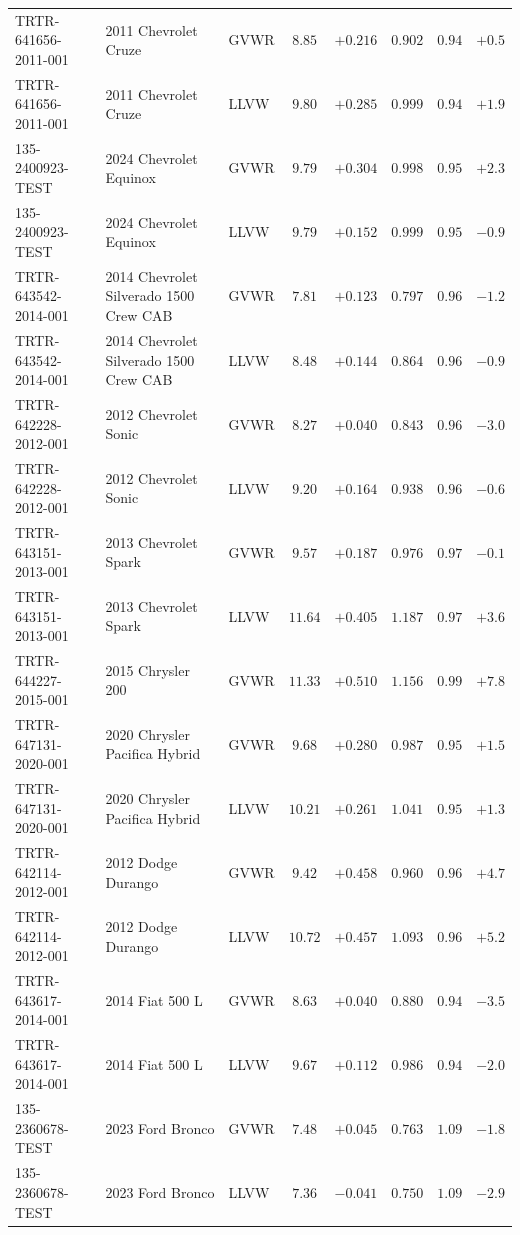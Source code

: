 {\begin{longtable}{lp{2.9cm}lccccc}
TRTR-641656-2011-001 & 2011 Chevrolet Cruze & GVWR & $8.85$ & $+0.216$ & $0.902$ & $0.94$ & $+0.5$\\
TRTR-641656-2011-001 & 2011 Chevrolet Cruze & LLVW & $9.80$ & $+0.285$ & $0.999$ & $0.94$ & $+1.9$\\
135-2400923-TEST & 2024 Chevrolet Equinox & GVWR & $9.79$ & $+0.304$ & $0.998$ & $0.95$ & $+2.3$\\
135-2400923-TEST & 2024 Chevrolet Equinox & LLVW & $9.79$ & $+0.152$ & $0.999$ & $0.95$ & $-0.9$\\
TRTR-643542-2014-001 & 2014 Chevrolet Silverado 1500 Crew CAB & GVWR & $7.81$ & $+0.123$ & $0.797$ & $0.96$ & $-1.2$\\
TRTR-643542-2014-001 & 2014 Chevrolet Silverado 1500 Crew CAB & LLVW & $8.48$ & $+0.144$ & $0.864$ & $0.96$ & $-0.9$\\
TRTR-642228-2012-001 & 2012 Chevrolet Sonic & GVWR & $8.27$ & $+0.040$ & $0.843$ & $0.96$ & $-3.0$\\
TRTR-642228-2012-001 & 2012 Chevrolet Sonic & LLVW & $9.20$ & $+0.164$ & $0.938$ & $0.96$ & $-0.6$\\
TRTR-643151-2013-001 & 2013 Chevrolet Spark & GVWR & $9.57$ & $+0.187$ & $0.976$ & $0.97$ & $-0.1$\\
TRTR-643151-2013-001 & 2013 Chevrolet Spark & LLVW & $11.64$ & $+0.405$ & $1.187$ & $0.97$ & $+3.6$\\
TRTR-644227-2015-001 & 2015 Chrysler 200 & GVWR & $11.33$ & $+0.510$ & $1.156$ & $0.99$ & $+7.8$\\
TRTR-647131-2020-001 & 2020 Chrysler Pacifica Hybrid & GVWR & $9.68$ & $+0.280$ & $0.987$ & $0.95$ & $+1.5$\\
TRTR-647131-2020-001 & 2020 Chrysler Pacifica Hybrid & LLVW & $10.21$ & $+0.261$ & $1.041$ & $0.95$ & $+1.3$\\
TRTR-642114-2012-001 & 2012 Dodge Durango & GVWR & $9.42$ & $+0.458$ & $0.960$ & $0.96$ & $+4.7$\\
TRTR-642114-2012-001 & 2012 Dodge Durango & LLVW & $10.72$ & $+0.457$ & $1.093$ & $0.96$ & $+5.2$\\
TRTR-643617-2014-001 & 2014 Fiat 500 L & GVWR & $8.63$ & $+0.040$ & $0.880$ & $0.94$ & $-3.5$\\
TRTR-643617-2014-001 & 2014 Fiat 500 L & LLVW & $9.67$ & $+0.112$ & $0.986$ & $0.94$ & $-2.0$\\
135-2360678-TEST & 2023 Ford Bronco & GVWR & $7.48$ & $+0.045$ & $0.763$ & $1.09$ & $-1.8$\\
135-2360678-TEST & 2023 Ford Bronco & LLVW & $7.36$ & $-0.041$ & $0.750$ & $1.09$ & $-2.9$\\

\end{longtable}}
